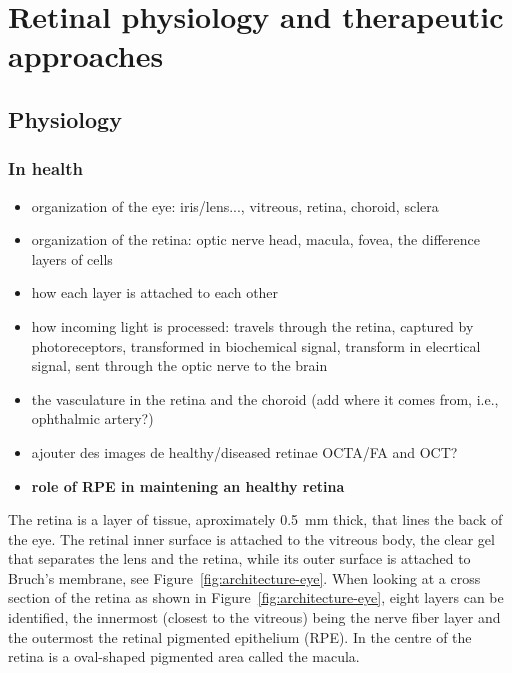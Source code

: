 \documentclass[12pt,a4paper]{journal}
\begin{document}
\section*{Retinal physiology and therapeutic approaches}

\subsection*{Physiology}

\subsubsection*{In health}

\begin{itemize}
\item organization of the eye: iris/lens..., vitreous, retina, choroid, sclera
\item organization of the retina: optic nerve head, macula, fovea, the difference layers of cells
\item how each layer is attached to each other
\item how incoming light is processed: travels through the retina, captured by photoreceptors, transformed in biochemical signal, transform in elecrtical signal, sent through the optic nerve to the brain
\item the vasculature in the retina and the choroid (add where it comes from, i.e., ophthalmic artery?)
\item ajouter des images de healthy/diseased retinae OCTA/FA and OCT?
\item \textbf{role of RPE in maintening an healthy retina}
\end{itemize}

The retina is a layer of tissue, aproximately \SI{0.5}{\mm} thick, that lines the back of the eye.
The retinal inner surface is attached to the vitreous body, the clear gel that separates the lens and the retina, while its outer surface is attached to Bruch's membrane, see Figure~\ref{fig:architecture-eye}.
When looking at a cross section of the retina as shown in Figure~\ref{fig:architecture-eye}, eight layers can be identified, the innermost (closest to the vitreous) being the nerve fiber layer and the outermost the retinal pigmented epithelium (RPE).
In the centre of the retina is a oval-shaped pigmented area called the macula.
\end{document}

